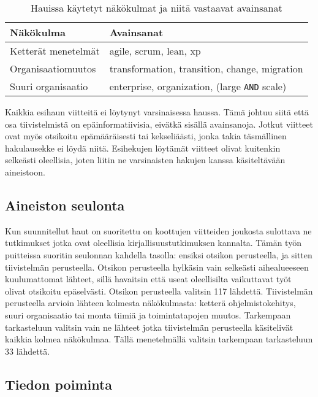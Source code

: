 \begin{table}
    \begin{tabular}{|l|l|}
        \hline
        Näkökulma           & Avainsanat   \\ \hline
        Ketterät menetelmät & agile, scrum, lean, xp \\ 
        Organisaatiomuutos  & transformation, transition, change, migration \\
        Suuri organisaatio  & enterprise, organization, (large \texttt{AND} scale) \\
        \hline
    \end{tabular}
	\caption{Hauissa käytetyt näkökulmat ja niitä vastaavat avainsanat}
	\label{table:hakulausekkeet}
\end{table}

Kaikkia esihaun viitteitä ei löytynyt varsinaisessa haussa. Tämä johtuu siitä
että osa tiivistelmistä on epäinformatiivisia, eivätkä sisällä avainsanoja.
Jotkut viitteet ovat myös otsikoitu epämääräisesti tai kekseliäästi, jonka takia
täsmällinen hakulausekke ei löydä niitä. Esihekujen löytämät viitteet olivat
kuitenkin selkeästi oleellisia, joten liitin ne varsinaisten hakujen kanssa
käsiteltävään aineistoon.

\subsection{Aineiston seulonta}

Kun suunnitellut haut on suoritettu on koottujen viitteiden joukosta sulottava
ne tutkimukset jotka ovat oleellisia kirjallisuustutkimuksen kannalta. Tämän
työn puitteissa suoritin seulonnan kahdella tasolla: ensiksi otsikon
perusteella, ja sitten tiivistelmän perusteella. Otsikon perusteella hylkäsin
vain selkeästi aihealueeseen kuulumattomat lähteet, sillä havaitsin että useat
oleellisilta vaikuttavat työt olivat otsikoitu epäselvästi. Otsikon perusteella
valitsin 117 lähdettä. Tiivistelmän perusteella arvioin lähteen kolmesta
näkökulmasta: ketterä ohjelmistokehitys, suuri organisaatio tai monta tiimiä ja
toimintatapojen muutos. Tarkempaan tarkasteluun valitsin vain ne lähteet jotka
tiivistelmän perusteella käsitelivät kaikkia kolmea näkökulmaa. Tällä
menetelmällä valitsin tarkempaan tarkasteluun 33 lähdettä.

\subsection{Tiedon poiminta}

